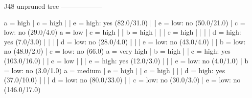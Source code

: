 J48 unpruned tree
------------------

a = high
|   c = high
|   |   e = high: yes (82.0/31.0)
|   |   e = low: no (50.0/21.0)
|   c = low: no (29.0/4.0)
a = low
|   c = high
|   |   b = high
|   |   |   e = high
|   |   |   |   d = high: yes (7.0/3.0)
|   |   |   |   d = low: no (28.0/4.0)
|   |   |   e = low: no (43.0/4.0)
|   |   b = low: no (48.0/2.0)
|   c = low: no (66.0)
a = very high
|   b = high
|   |   c = high: yes (103.0/16.0)
|   |   c = low
|   |   |   e = high: yes (12.0/3.0)
|   |   |   e = low: no (4.0/1.0)
|   b = low: no (3.0/1.0)
a = medium
|   e = high
|   |   c = high
|   |   |   d = high: yes (37.0/10.0)
|   |   |   d = low: no (80.0/33.0)
|   |   c = low: no (30.0/3.0)
|   e = low: no (146.0/17.0)
